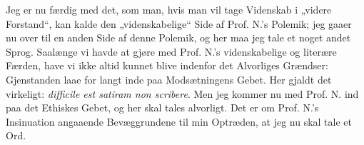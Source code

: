 \documentclass[12pt,a4paper]{book}
\newcommand{\opage}[1]{\marginnote{\footnotesize\textit{[#1]}}}
\begin{document}
Jeg er nu færdig med det, som man, hvis man vil tage Videnskab i „videre
Forstand“, kan kalde den „videnskabelige“ Side af Prof. N.'s Polemik; jeg gaaer
nu over
\opage{27} til en anden Side af denne Polemik, og her maa jeg tale et noget andet Sprog.
Saalænge vi havde at gjøre med Prof. N.'s videnskabelige og literære Færden,
have vi ikke altid kunnet blive indenfor det Alvorliges Grændser: Gjenstanden
laae for langt inde paa Modsætningens Gebet. Her gjaldt det virkeligt:
\textit{difficile est satiram non scribere}. Men jeg kommer nu med Prof. N. ind
paa det Ethiskes Gebet, og her skal tales alvorligt. Det er om Prof. N.'s
Insinuation angaaende Bevæggrundene til min Optræden, at jeg nu skal tale et Ord.
\end{document}
